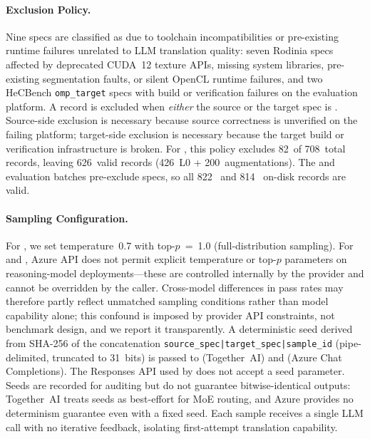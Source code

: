 \paragraph{\knownfail{} Exclusion Policy.} Nine specs are classified as \knownfail{} due to toolchain incompatibilities or pre-existing runtime failures unrelated to LLM translation quality: seven Rodinia specs affected by deprecated CUDA~12 texture APIs, missing system libraries, pre-existing segmentation faults, or silent OpenCL runtime failures, and two HeCBench \texttt{omp\_target} specs with build or verification failures on the evaluation platform.
A record is excluded when \emph{either} the source or the target spec is \knownfail{}. Source-side exclusion is necessary because source correctness is unverified on the failing platform; target-side exclusion is necessary because the target build or verification infrastructure is broken. For \qwenshort{}, this policy excludes 82~of 708~total records, leaving 626~valid records (426~L0 + 200~augmentations). The \gptnew{} and \codex{} evaluation batches pre-exclude \knownfail{} specs, so all 822~\gptnew{} and 814~\codex{} on-disk records are valid.

\paragraph{Sampling Configuration.}
\label{sec:sampling-config}
For \qwenshort{}, we set temperature~0.7 with top-$p$~=~1.0 (full-distribution sampling). For \gptnew{} and \codex{}, Azure API does not permit explicit temperature or top-$p$ parameters on reasoning-model deployments---these are controlled internally by the provider and cannot be overridden by the caller. Cross-model differences in pass rates may therefore partly reflect unmatched sampling conditions rather than model capability alone; this confound is imposed by provider API constraints, not benchmark design, and we report it transparently. A deterministic seed derived from SHA-256 of the concatenation \texttt{source\_spec|target\_spec|sample\_id} (pipe-delimited, truncated to 31~bits) is passed to \qwenshort{} (Together~AI) and \gptnew{} (Azure Chat Completions). The Responses API used by \codex{} does not accept a seed parameter. Seeds are recorded for auditing but do not guarantee bitwise-identical outputs: Together~AI treats seeds as best-effort for MoE routing, and Azure provides no determinism guarantee even with a fixed seed. Each sample receives a single LLM call with no iterative feedback, isolating first-attempt translation capability.

